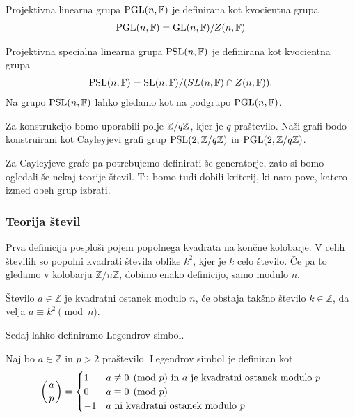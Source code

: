 \begin{definicija}
    Projektivna linearna grupa \(\operatorname{PGL}(n, \mathbb F)\) je definirana kot kvocientna grupa 
    \begin{align*}
        \operatorname{PGL}(n, \mathbb F) = \operatorname{GL}(n, \mathbb F)/Z(n, \mathbb F)
    \end{align*}

    Projektivna specialna linearna grupa \(\operatorname{PSL}(n, \mathbb F)\) je definirana kot kvocientna grupa 
    \begin{align*}
        \operatorname{PSL}(n, \mathbb F) = \operatorname{SL}(n, \mathbb F)/(SL(n, \mathbb F)\cap Z(n, \mathbb F)).
    \end{align*}
    Na grupo \(\operatorname{PSL}(n, \mathbb F)\) lahko gledamo kot na podgrupo \(\operatorname{PGL}(n, \mathbb F)\).
\end{definicija}

Za konstrukcijo bomo uporabili polje \(\mathbb Z/q\mathbb Z\), kjer je \(q\) praštevilo. Naši grafi bodo konstruirani kot Cayleyjevi grafi grup \(\operatorname{PSL}(2, \mathbb Z/q\mathbb Z)\) in \(\operatorname{PGL}(2, \mathbb Z/q\mathbb Z)\).

Za Cayleyjeve grafe pa potrebujemo definirati še generatorje, zato si bomo ogledali še nekaj teorije števil. Tu bomo tudi dobili kriterij, ki nam pove, katero izmed obeh grup izbrati.

\subsubsection{Teorija števil}
Prva definicija posploši pojem popolnega kvadrata na končne kolobarje. V celih številih so popolni kvadrati števila oblike \(k^2\), kjer je \(k\) celo število. Če pa to gledamo v kolobarju \(\mathbb Z/n\mathbb Z\), dobimo enako definicijo, samo modulo \(n\).
\begin{definicija}
    Število \(a\in \mathbb Z\) je kvadratni ostanek modulo \(n\), če obstaja takšno število \(k\in \mathbb Z\), da velja \(a\equiv k^2 \pmod n\).
\end{definicija}

Sedaj lahko definiramo Legendrov simbol.
\begin{definicija}
    Naj bo \(a\in \mathbb Z\) in \(p>2\) praštevilo. Legendrov simbol je definiran kot
    \begin{align*}
        \left(\frac{a}{p}\right) =
        \begin{cases}
            1  & a \not\equiv 0\pmod p \text{ in } a \text{ je kvadratni ostanek modulo } p \\
            0  & a \equiv 0 \pmod p                                            \\
            -1 & a \text{ ni kvadratni ostanek modulo } p
        \end{cases}
    \end{align*}
\end{definicija}

